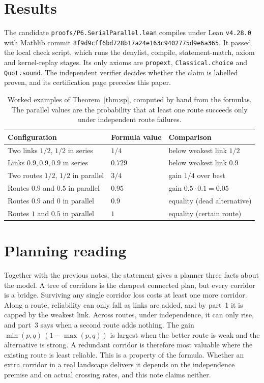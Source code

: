 \documentclass[11pt]{article}
\begin{document}
\section{Results}
The candidate \texttt{proofs/P6.SerialParallel.lean} compiles under Lean \texttt{v4.28.0} with Mathlib
commit \texttt{8f9d9cff6bd728b17a24e163c9402775d9e6a365}. It passed the local check script, which runs the
denylist, compile, statement-match, axiom and kernel-replay stages. Its only axioms are \texttt{propext},
\texttt{Classical.choice} and \texttt{Quot.sound}. The independent verifier decides whether the claim is
labelled proven, and its certification page precedes this paper.

\begin{table}[h]
\centering
\begin{tabular}{lll}
\toprule
Configuration & Formula value & Comparison\\
\midrule
Two links $1/2$, $1/2$ in series & $1/4$ & below weakest link $1/2$\\
Links $0.9,0.9,0.9$ in series & $0.729$ & below weakest link $0.9$\\
Two routes $1/2$, $1/2$ in parallel & $3/4$ & gain $1/4$ over best\\
Routes $0.9$ and $0.5$ in parallel & $0.95$ & gain $0.5\cdot0.1=0.05$\\
Routes $0.9$ and $0$ in parallel & $0.9$ & equality (dead alternative)\\
Routes $1$ and $0.5$ in parallel & $1$ & equality (certain route)\\
\bottomrule
\end{tabular}
\caption{Worked examples of Theorem~\ref{thm:sp}, computed by hand from the formulas. The parallel
values are the probability that at least one route succeeds only under independent route failures.}
\label{tab:examples}
\end{table}

\section{Planning reading}
Together with the previous notes, the statement gives a planner three facts about the model. A tree of
corridors is the cheapest connected plan, but every corridor is a bridge. Surviving any single corridor
loss costs at least one more corridor. Along a route, reliability can only fall as links are added, and
by part~1 it is capped by the weakest link. Across routes, under independence, it can only rise, and
part~3 says when a second route adds nothing. The gain $\min(p,q)\,(1-\max(p,q))$ is largest when the
better route is weak and the alternative is strong. A redundant corridor is therefore most valuable
where the existing route is least reliable. This is a property of the formula. Whether an extra corridor
in a real landscape delivers it depends on the independence premise and on actual crossing rates, and
this note claims neither.
\end{document}
